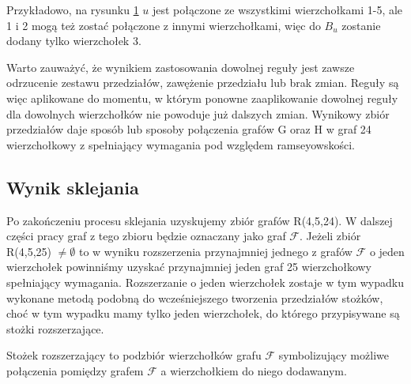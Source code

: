 Przykładowo, na rysunku \ref{zasadaD2} $u$ jest połączone ze wszystkimi wierzchołkami 1-5, ale 1 i 2 mogą też zostać połączone z innymi wierzchołkami, więc do
$B_u$ zostanie dodany tylko wierzchołek 3.   
\begin{figure}[H]
  \centering
 \caption{}
 \label{zasadaD2}
 \end{figure}

Warto zauważyć, że wynikiem zastosowania dowolnej reguły jest zawsze odrzucenie zestawu przedziałów, zawężenie przedziału lub brak zmian. Reguły są więc aplikowane do momentu, w którym ponowne zaaplikowanie dowolnej reguły dla dowolnych wierzchołków nie powoduje już dalszych zmian. Wynikowy zbiór przedziałów daje sposób lub sposoby połączenia grafów G oraz H w graf 24 wierzchołkowy z spełniający wymagania pod względem ramseyowskości.


\subsection{Wynik sklejania}

Po zakończeniu procesu sklejania uzyskujemy zbiór grafów R(4,5,24). W dalszej części pracy graf z tego zbioru będzie oznaczany jako graf $\mathcal{F}$. Jeżeli zbiór R(4,5,25) $\neq \emptyset$ to w wyniku rozszerzenia przynajmniej jednego z grafów $\mathcal{F}$ o jeden wierzchołek powinniśmy uzyskać przynajmniej jeden graf 25 wierzchołkowy spełniający wymagania. 
Rozszerzanie o jeden wierzchołek zostaje w tym wypadku wykonane metodą podobną do wcześniejszego tworzenia przedziałów stożków, choć w tym wypadku mamy tylko jeden wierzchołek, do którego przypisywane są stożki rozszerzające.
\begin{definition} Stożek rozszerzający to podzbiór wierzchołków grafu $\mathcal{F}$ symbolizujący możliwe połączenia pomiędzy grafem $\mathcal{F}$ a wierzchołkiem do niego dodawanym.
\end{definition}

